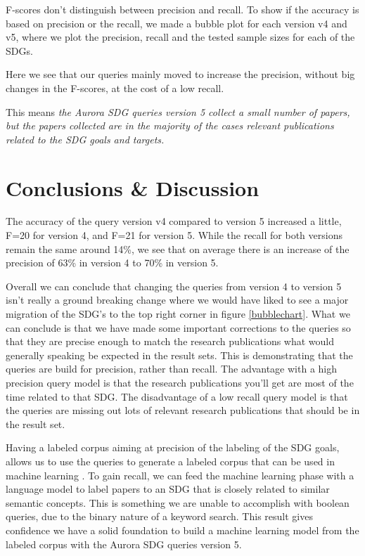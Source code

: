 \documentclass{article}
\begin{document}
F-scores don't distinguish between precision and recall. To show if the accuracy is based on precision or the recall, we made a bubble plot for each version v4 and v5, where we plot the precision, recall and the tested sample sizes for each of the SDGs. 

Here we see that our queries mainly moved to increase the precision, without big changes in the F-scores, at the cost of a low recall.

This means \emph{the Aurora SDG queries version 5 collect a small number of papers, but the papers collected are in the majority of the cases relevant publications related to the SDG goals and targets.}

\section{Conclusions \& Discussion}
The accuracy of the query version v4 compared to version 5 increased a little, F=20 for version 4, and F=21 for version 5. While the recall for both versions remain the same around 14\%, we see that on average there is an increase of the precision of 63\% in version 4 to 70\% in version 5.

Overall we can conclude that changing the queries from version 4 to version 5 isn't really a ground breaking change where we would have liked to see a major migration of the SDG's to the top right corner in figure \ref{bubblechart}. What we can conclude is that we have made some important corrections to the queries so that they are precise enough to match the research publications what would generally speaking be expected in the result sets. This is demonstrating that the queries are build for precision, rather than recall. The advantage with a high precision query model is that the research publications you'll get are most of the time related to that SDG. The disadvantage of a low recall query model is that the queries are missing out lots of relevant research publications that should be in the result set.

Having a labeled corpus aiming at precision of the labeling of the SDG goals, allows us to use the queries to generate a labeled corpus that can be used in machine learning \cite{zhang_matching_2020}.  To gain recall, we can feed the machine learning phase with a language model to label papers to an SDG that is closely related to similar semantic concepts. This is something we are unable to accomplish with boolean queries, due to the binary nature of a keyword search. This result gives confidence we have a solid foundation to build a machine learning model from the labeled corpus with the Aurora SDG queries version 5. 
\end{document}
